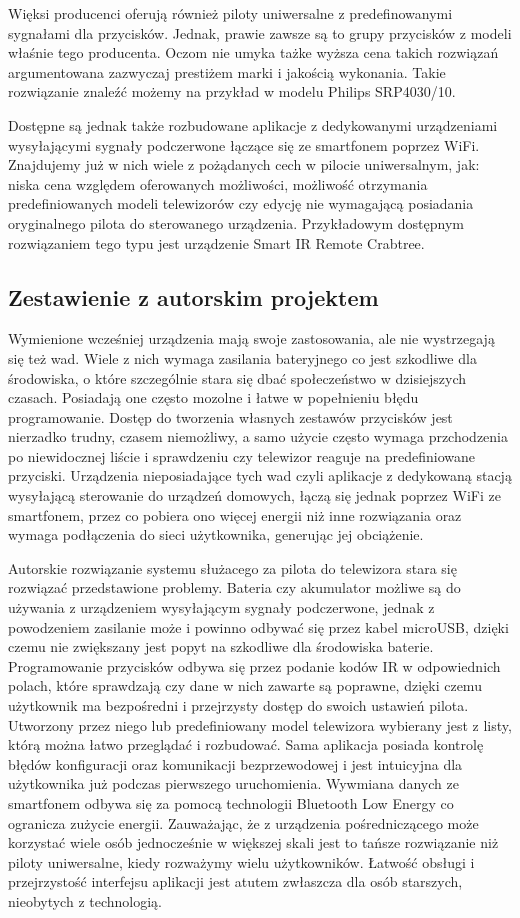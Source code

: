 \documentclass[12pt,twoside,draft]{article}
\begin{document}
Więksi producenci oferują również piloty uniwersalne z predefinowanymi sygnałami dla przycisków. Jednak,
prawie zawsze są to grupy przycisków z modeli właśnie tego producenta. Oczom nie umyka tażke wyższa cena takich
rozwiązań argumentowana zazwyczaj prestiżem marki i jakością wykonania. Takie rozwiązanie znaleźć
możemy na przykład w modelu Philips SRP4030/10\cite{expensiveController}.

Dostępne są jednak także rozbudowane aplikacje z dedykowanymi urządzeniami wysyłającymi sygnały podczerwone łączące się ze smartfonem poprzez WiFi. Znajdujemy już w nich wiele z pożądanych cech w pilocie uniwersalnym, jak: niska cena względem oferowanych możliwości, możliwość otrzymania predefiniowanych modeli telewizorów czy edycję nie wymagającą posiadania oryginalnego pilota do sterowanego urządzenia. Przykładowym dostępnym rozwiązaniem tego typu jest urządzenie Smart IR Remote Crabtree\cite{appController}.
\subsection{Zestawienie z autorskim projektem}
{Wymienione wcześniej urządzenia mają swoje zastosowania, ale nie wystrzegają się też wad. Wiele z nich wymaga zasilania bateryjnego co jest szkodliwe dla środowiska, o które szczególnie stara się dbać społeczeństwo w dzisiejszych czasach. Posiadają one często mozolne i łatwe w popełnieniu błędu programowanie. Dostęp do tworzenia własnych zestawów przycisków jest nierzadko trudny, czasem niemożliwy, a samo użycie często wymaga przchodzenia po niewidocznej liście i sprawdzeniu czy telewizor reaguje na predefiniowane przyciski. Urządzenia nieposiadające tych wad czyli aplikacje z dedykowaną stacją wysyłającą sterowanie do urządzeń domowych, łączą się jednak poprzez WiFi ze smartfonem, przez co pobiera ono więcej energii niż inne rozwiązania oraz wymaga podłączenia do sieci użytkownika, generując jej obciążenie.

   Autorskie rozwiązanie systemu służacego za pilota do telewizora stara się rozwiązać przedstawione problemy. Bateria czy akumulator możliwe są do używania z urządzeniem wysyłającym sygnały podczerwone, jednak z powodzeniem zasilanie może i powinno odbywać się przez kabel microUSB, dzięki czemu nie zwiększany jest popyt na szkodliwe dla środowiska baterie. Programowanie przycisków odbywa się przez podanie kodów IR w odpowiednich polach, które sprawdzają czy dane w nich zawarte są poprawne, dzięki czemu użytkownik ma bezpośredni i przejrzysty dostęp do swoich ustawień pilota. Utworzony przez niego lub predefiniowany model telewizora wybierany jest z listy, którą można łatwo przeglądać i rozbudować. Sama aplikacja posiada kontrolę błędów konfiguracji oraz komunikacji bezprzewodowej i jest intuicyjna dla użytkownika już podczas pierwszego uruchomienia. Wywmiana danych ze smartfonem odbywa się za pomocą technologii Bluetooth Low Energy co ogranicza zużycie energii. Zauważając, że z urządzenia pośredniczącego może korzystać wiele osób jednocześnie w większej skali jest to tańsze rozwiązanie niż piloty uniwersalne, kiedy rozważymy wielu użytkowników. Łatwość obsługi i przejrzystość interfejsu aplikacji jest atutem zwłaszcza dla osób starszych, nieobytych z technologią.
}
\clearpage
\end{document}
